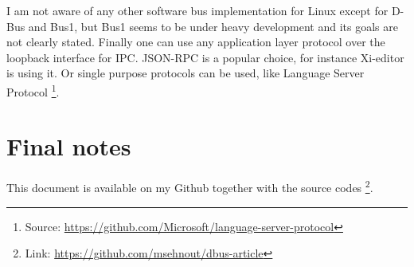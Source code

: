 \documentclass[a4paper,10.5pt]{article}
\begin{document}
I am not aware of any other software bus implementation for Linux except for D-Bus and Bus1, but Bus1 seems to be under heavy development and its goals are not clearly stated. Finally one can use any application layer protocol over the loopback interface for IPC. JSON-RPC is a popular choice, for instance Xi-editor is using it. Or single purpose protocols can be used, like Language Server Protocol \footnote{Source: \url{https://github.com/Microsoft/language-server-protocol}}.

\section{Final notes}

This document is available on my Github together with the source codes \footnote{Link: \url{https://github.com/msehnout/dbus-article}}.
\end{document}
